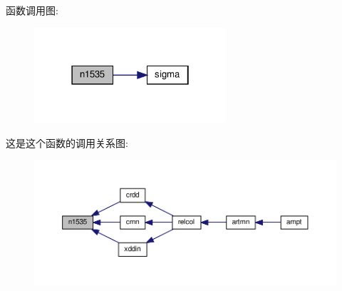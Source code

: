 函数调用图\+:
\nopagebreak
\begin{figure}[H]
\begin{center}
\leavevmode
\includegraphics[width=202pt]{n1535_8f90_a6cfc024d9f4ecaf410cc554dc0ebb73d_cgraph}
\end{center}
\end{figure}
这是这个函数的调用关系图\+:
\nopagebreak
\begin{figure}[H]
\begin{center}
\leavevmode
\includegraphics[width=350pt]{n1535_8f90_a6cfc024d9f4ecaf410cc554dc0ebb73d_icgraph}
\end{center}
\end{figure}
